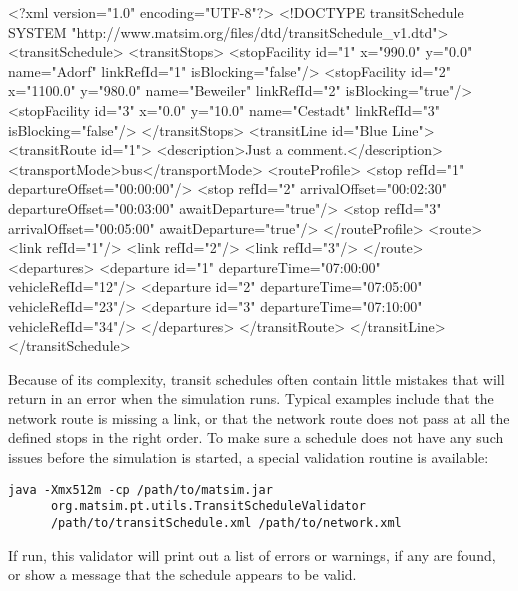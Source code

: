 \begin{xml-file}[caption=An example of a schedule.xml,
label=lst:BuildingScenarios:schedule.xml]
<?xml version="1.0" encoding="UTF-8"?>
<!DOCTYPE transitSchedule SYSTEM "http://www.matsim.org/files/dtd/transitSchedule_v1.dtd">
<transitSchedule>
	<transitStops>
		<stopFacility id="1" x="990.0"  y="0.0"   name="Adorf"    
		                                          linkRefId="1" isBlocking="false"/>
		<stopFacility id="2" x="1100.0" y="980.0" name="Beweiler" 
		                                          linkRefId="2" isBlocking="true"/>
		<stopFacility id="3" x="0.0"    y="10.0"  name="Cestadt"  
		                                          linkRefId="3" isBlocking="false"/>
	</transitStops>
	<transitLine id="Blue Line">
		<transitRoute id="1">
			<description>Just a comment.</description>
			<transportMode>bus</transportMode>
			<routeProfile>
				<stop refId="1" departureOffset="00:00:00"/>
				<stop refId="2" arrivalOffset="00:02:30" departureOffset="00:03:00" 
				                                         awaitDeparture="true"/>
				<stop refId="3" arrivalOffset="00:05:00" awaitDeparture="true"/>
			</routeProfile>
			<route>
				<link refId="1"/>
				<link refId="2"/>
				<link refId="3"/>
			</route>
			<departures>
				<departure id="1" departureTime="07:00:00" vehicleRefId="12"/>
				<departure id="2" departureTime="07:05:00" vehicleRefId="23"/>
				<departure id="3" departureTime="07:10:00" vehicleRefId="34"/>
			</departures>
		</transitRoute>
	</transitLine>
</transitSchedule>
\end{xml-file}

Because of its complexity, transit schedules often contain little mistakes that
will return in an error when the simulation runs. Typical examples include that
the network route is missing a link, or that the network route does not pass at
all the defined stops in the right order. To make sure a schedule does not have
any such issues before the simulation is started, a special validation routine
is available:

\begin{verbatim}
java -Xmx512m -cp /path/to/matsim.jar 
      org.matsim.pt.utils.TransitScheduleValidator
      /path/to/transitSchedule.xml /path/to/network.xml
\end{verbatim}

If run, this validator will print out a list of errors or warnings, if any are
found, or show a message that the schedule appears to be valid.

